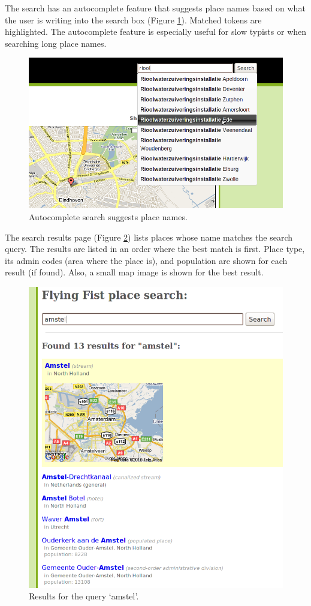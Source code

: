 \documentclass[a4paper,12pt]{article}
\begin{document}
\noindent The search has an autocomplete feature that suggests place
names based on what the user is writing into the search box (Figure
\ref{autocomplete}). Matched tokens are highlighted. The autocomplete
feature is especially useful for slow typists or when searching long
place names.

\begin{figure}[h]
  \includegraphics[width=\linewidth]{img/autocomplete.png}
  \caption{Autocomplete search suggests place names.}
  \label{autocomplete}
\end{figure}

The search results page (Figure \ref{search}) lists places whose name
matches the search query. The results are listed in an order where the
best match is first. Place type, its admin codes (area where the place
is), and population are shown for each result (if found). Also, a
small map image is shown for the best result.

\begin{figure}[h]
  \includegraphics[width=\linewidth]{img/search.png}
  \caption{Results for the query `amstel'.}
  \label{search}
\end{figure}
\end{document}
